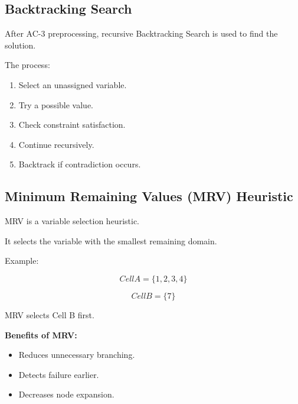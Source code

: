 \documentclass[12pt,a4paper]{article}
\begin{document}
\subsection{Backtracking Search}


After AC-3 preprocessing, recursive Backtracking Search is used to find the
solution.


The process:

\begin{enumerate}

\item Select an unassigned variable.

\item Try a possible value.

\item Check constraint satisfaction.

\item Continue recursively.

\item Backtrack if contradiction occurs.

\end{enumerate}



\subsection{Minimum Remaining Values (MRV) Heuristic}


MRV is a variable selection heuristic.

It selects the variable with the smallest remaining domain.


Example:


\[
Cell A=\{1,2,3,4\}
\]


\[
Cell B=\{7\}
\]


MRV selects Cell B first.


\textbf{Benefits of MRV:}

\begin{itemize}

\item Reduces unnecessary branching.

\item Detects failure earlier.

\item Decreases node expansion.

\end{itemize}



\end{document}
